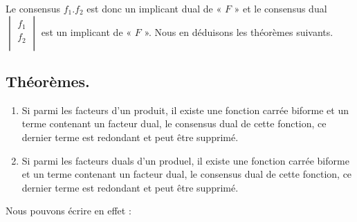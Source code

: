 \medskip 



Le consensus $f_1 . f_2$ est donc un implicant dual de « $F$ » et le consensus dual $\begin{vmatrix} f_1 \\ f_2 \\ \end{vmatrix} $ est un implicant de   « $F$ ». Nous en déduisons les théorèmes suivants. 

\subsection{Théorèmes.} \begin{enumerate}
\item Si parmi les facteurs d'un produit, il existe une fonction carrée biforme et un terme contenant un facteur dual, le consensus dual de cette fonction, ce dernier terme est redondant et peut être supprimé. 

\item Si parmi les facteurs  duals d'un produel, il existe une fonction carrée biforme et un terme contenant un facteur dual, le consensus dual de cette fonction, ce dernier terme est redondant et peut être supprimé. 

\end{enumerate} 

Nous pouvons écrire en effet : 


\bigskip 


